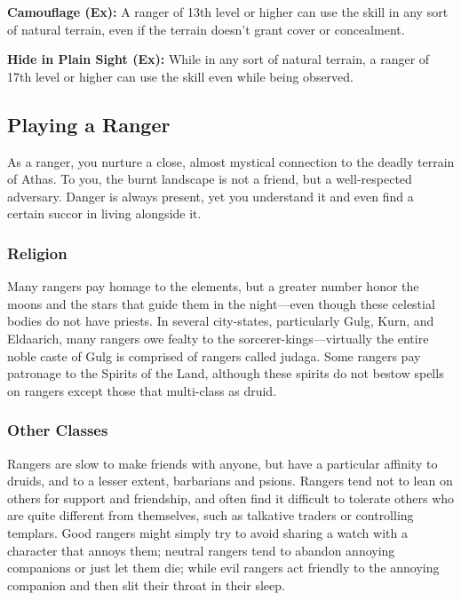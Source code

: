 \textbf{Camouflage (Ex):} A ranger of 13th level or higher can use the  skill in any sort of natural terrain, even if the terrain doesn't grant cover or concealment.

\textbf{Hide in Plain Sight (Ex):} While in any sort of natural terrain, a ranger of 17th level or higher can use the  skill even while being observed.

\subsection{Playing a Ranger}

As a ranger, you nurture a close, almost mystical connection to the deadly terrain of Athas. To you, the burnt landscape is not a friend, but a well-respected adversary. Danger is always present, yet you understand it and even find a certain succor in living alongside it.

\subsubsection{Religion}

Many rangers pay homage to the elements, but a greater number honor the moons and the stars that guide them in the night---even though these celestial bodies do not have priests. In several city-states, particularly Gulg,
Kurn, and Eldaarich, many rangers owe fealty to the sorcerer-kings---virtually the entire noble caste of Gulg is comprised of rangers called judaga. Some rangers pay patronage to the Spirits of the Land, although these spirits do not bestow spells on rangers except those that multi-class as druid.

\subsubsection{Other Classes}

Rangers are slow to make friends with anyone, but have a particular affinity to druids, and to a lesser extent, barbarians and psions. Rangers tend not to lean on others for support and friendship, and often find it difficult to tolerate others who are quite different from themselves, such as talkative traders or controlling templars. Good rangers might simply try to avoid sharing a watch with a character that annoys them; neutral rangers tend to abandon annoying companions or just let them die; while evil rangers act friendly to the annoying companion and then slit their throat in their sleep.

